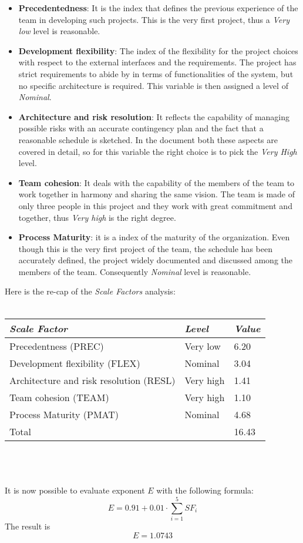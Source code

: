 \documentclass[11pt,a4paper]{report}
\begin{document}
\begin{itemize}
	\item \textbf{Precedentedness}: It is the index that defines the previous experience of the team in developing such projects. This is the very first project, thus a \textit{Very low} level is reasonable.
	\item \textbf{Development flexibility}: The index of the flexibility for the project choices with respect to the external interfaces and the requirements. The project has strict requirements to abide by in terms of functionalities of the system, but no specific architecture is required. This variable is then assigned a level of \textit{Nominal}.
	\item \textbf{Architecture and risk resolution}: It reflects the capability of managing possible risks with an accurate contingency plan and the fact that a reasonable schedule is sketched. In the document both these aspects are covered in detail, so for this variable the right choice is to pick the \textit{Very High} level.
	\item \textbf{Team cohesion}: It deals with the capability of the members of the team to work together in harmony and sharing the same vision. The team is made of only three people in this project and they work with great commitment and together, thus \textit{Very high} is the right degree.
	\item \textbf{Process Maturity}: it is a index of the maturity of the organization. Even though this is the very first project of the team, the schedule has been accurately defined, the project widely documented and discussed among the members of the team. Consequently \textit{Nominal} level is reasonable.
\end{itemize}
Here is the re-cap of the \textit{Scale Factors} analysis:
\\\\
\begin{tabularx}{\textwidth}{|p{8cm}|X|X|}
	\hline
	\textit{Scale Factor} & \textit{Level} & \textit{Value}\\
	\hline
	Precedentness (PREC) & Very low & 6.20\\
	Development flexibility (FLEX) & Nominal & 3.04\\
	Architecture and risk resolution (RESL) & Very high & 1.41\\
	Team cohesion (TEAM) & Very high & 1.10\\
	Process Maturity (PMAT) & Nominal & 4.68\\
	\hline
	Total &  & 16.43\\
	\hline
\end{tabularx}\\\\\\
It is now possible to evaluate exponent $E$ with the following formula:
$$E = 0.91+0.01 \cdot \sum_{i=1}^5 SF_i$$
The result is 
$$E = 1.0743$$
\end{document}
